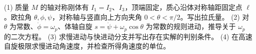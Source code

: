 (1) 质量 \(M\) 的轴对称刚体有 \(I_1=I_2\)、\(I_3\)，顶端固定，质心沿体对称轴距固定点 \(\ell\)。欧拉角 \(\theta,\phi,\psi\)，对称轴与竖直向上方向夹角 \(0<\theta<\pi/2\)。写出拉氏量。
(2) 对 \(\theta\) 为常数、\(\dot\phi=\omega_p\)、体轴自旋 \(s=\dot\psi+\omega_p\cos\theta\) 为常数的规则进动，推导关于 \(\omega_p\) 的二次方程。
(3) 求慢进动与快进动分支并写出存在实解的判别条件。
(4) 在高速自旋极限求慢进动角速度，并检查所得角速度的单位。
